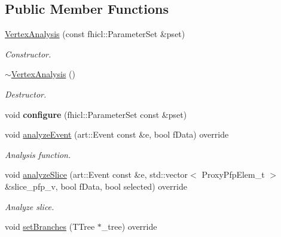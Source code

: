 \subsection*{Public Member Functions}
\begin{DoxyCompactItemize}
\item 
\hyperlink{classanalysis_1_1VertexAnalysis_adec367621161d1fb8c3722c54cc24452}{Vertex\+Analysis} (const fhicl\+::\+Parameter\+Set \&pset)
\begin{DoxyCompactList}\small\item\em Constructor. \end{DoxyCompactList}\item 
\hyperlink{classanalysis_1_1VertexAnalysis_a51614fa76833ac450a25cc59d57b602e}{$\sim$\+Vertex\+Analysis} ()\hypertarget{classanalysis_1_1VertexAnalysis_a51614fa76833ac450a25cc59d57b602e}{}\label{classanalysis_1_1VertexAnalysis_a51614fa76833ac450a25cc59d57b602e}

\begin{DoxyCompactList}\small\item\em Destructor. \end{DoxyCompactList}\item 
void {\bfseries configure} (fhicl\+::\+Parameter\+Set const \&pset)\hypertarget{classanalysis_1_1VertexAnalysis_a4dbe1d0f18392c838558d5365defb0d5}{}\label{classanalysis_1_1VertexAnalysis_a4dbe1d0f18392c838558d5365defb0d5}

\item 
void \hyperlink{classanalysis_1_1VertexAnalysis_ae5786ee30fa27f1e353d2f4be8d87303}{analyze\+Event} (art\+::\+Event const \&e, bool f\+Data) override\hypertarget{classanalysis_1_1VertexAnalysis_ae5786ee30fa27f1e353d2f4be8d87303}{}\label{classanalysis_1_1VertexAnalysis_ae5786ee30fa27f1e353d2f4be8d87303}

\begin{DoxyCompactList}\small\item\em Analysis function. \end{DoxyCompactList}\item 
void \hyperlink{classanalysis_1_1VertexAnalysis_a92a04f287cdc090fb83431f02882cb20}{analyze\+Slice} (art\+::\+Event const \&e, std\+::vector$<$ Proxy\+Pfp\+Elem\+\_\+t $>$ \&slice\+\_\+pfp\+\_\+v, bool f\+Data, bool selected) override\hypertarget{classanalysis_1_1VertexAnalysis_a92a04f287cdc090fb83431f02882cb20}{}\label{classanalysis_1_1VertexAnalysis_a92a04f287cdc090fb83431f02882cb20}

\begin{DoxyCompactList}\small\item\em Analyze slice. \end{DoxyCompactList}\item 
void \hyperlink{classanalysis_1_1VertexAnalysis_a14f9940c908530017f6cc5718a66e005}{set\+Branches} (T\+Tree $\ast$\+\_\+tree) override\hypertarget{classanalysis_1_1VertexAnalysis_a14f9940c908530017f6cc5718a66e005}{}\label{classanalysis_1_1VertexAnalysis_a14f9940c908530017f6cc5718a66e005}


\end{DoxyCompactItemize}
